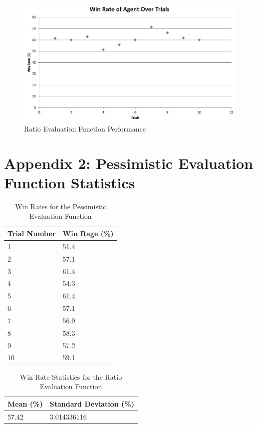 \documentclass[12pt]{article}
\begin{document}
\begin{figure}[h]
\centering
\caption{Ratio Evaluation Function Performance}
\includegraphics[scale=0.7]{ratio-evaluation-function-results.JPG}
\end{figure}

\clearpage
\section{Appendix 2: Pessimistic Evaluation Function Statistics}
\begin{table}[h]
\centering
\caption{Win Rates for the Pessimistic Evaluation Function}
\label{pessimistic-label}
\begin{tabular}{@{}|l|l|@{}}
\toprule
Trial Number & Win Rage (\%) \\ \midrule
1            & 51.4          \\ \midrule
2            & 57.1          \\ \midrule
3            & 61.4          \\ \midrule
4            & 54.3          \\ \midrule
5            & 61.4          \\ \midrule
6            & 57.1          \\ \midrule
7            & 56.9          \\ \midrule
8            & 58.3          \\ \midrule
9            & 57.2          \\ \midrule
10           & 59.1          \\ \bottomrule
\end{tabular}
\end{table}

\begin{table}[h]
\centering
\caption{Win Rate Statistics for the Ratio Evaluation Function}
\label{ratio-stats}
\begin{tabular}{@{}|l|l|@{}}
\toprule
Mean (\%)& Standard Deviation (\%) \\ \midrule
57.42           & 3.014336116
\\ \bottomrule
\end{tabular}
\end{table}
\end{document}
